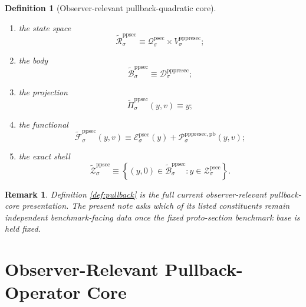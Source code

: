 \documentclass[11pt]{article}
\newcommand{\ProtoSectionState}[1]{\mathcal Q_{#1}^{\mathrm{psec}}}
\newcommand{\ProtoSectionFunctional}[1]{\mathscr E_{#1}^{\mathrm{psec}}}
\newcommand{\ProtoSectionShell}[1]{\mathcal Z_{#1}^{\mathrm{psec}}}
\newcommand{\PrePreProtoSectionVertical}[1]{V_{#1}^{\mathrm{pppresec}}}
\newcommand{\PrePreProtoSectionResidualBody}[1]{\mathcal D_{#1}^{\mathrm{pppresec}}}
\newcommand{\PrePreProtoSectionPullbackFunctional}[1]{\mathscr P_{#1}^{\mathrm{pppresec,pb}}}
\newcommand{\OperatorCorePreProtoSectionState}[1]{\widetilde{\mathcal R}_{#1}^{\mathrm{ppsec}}}
\newcommand{\OperatorCorePreProtoSectionBody}[1]{\widetilde{\mathcal B}_{#1}^{\mathrm{ppsec}}}
\newcommand{\OperatorCorePreProtoSectionProj}[1]{\widetilde{\Pi}_{#1}^{\mathrm{ppsec}}}
\newcommand{\OperatorCorePreProtoSectionFunctional}[1]{\widetilde{\mathscr F}_{#1}^{\mathrm{ppsec}}}
\newcommand{\OperatorCorePreProtoSectionShell}[1]{\widetilde{\mathcal Z}_{#1}^{\mathrm{ppsec}}}
\newtheorem{definition}{Definition}
\newtheorem{remark}{Remark}
\begin{document}
\begin{definition}[Observer-relevant pullback-quadratic core]
\begin{enumerate}
    \item the state space
    \[
    \OperatorCorePreProtoSectionState{\sigma}
    \equiv
    \ProtoSectionState{\sigma}\times\PrePreProtoSectionVertical{\sigma};
    \]
    \item the body
    \[
    \OperatorCorePreProtoSectionBody{\sigma}
    \equiv
    \PrePreProtoSectionResidualBody{\sigma};
    \]
    \item the projection
    \[
    \OperatorCorePreProtoSectionProj{\sigma}(y,v)\equiv y;
    \]
    \item the functional
    \[
    \OperatorCorePreProtoSectionFunctional{\sigma}(y,v)
    \equiv
    \ProtoSectionFunctional{\sigma}(y)
    +
    \PrePreProtoSectionPullbackFunctional{\sigma}(y,v);
    \]
    \item the exact shell
    \[
    \OperatorCorePreProtoSectionShell{\sigma}
    \equiv
    \left\{
    (y,0)\in\OperatorCorePreProtoSectionBody{\sigma}:y\in\ProtoSectionShell{\sigma}
    \right\}.
    \]
\end{enumerate}
\end{definition}

\begin{remark}
Definition \ref{def:pullback} is the full current observer-relevant pullback-core presentation. The present note asks which of its listed constituents remain independent benchmark-facing data once the fixed proto-section benchmark base is held fixed.
\end{remark}

\section{Observer-Relevant Pullback-Operator Core}
\end{document}
